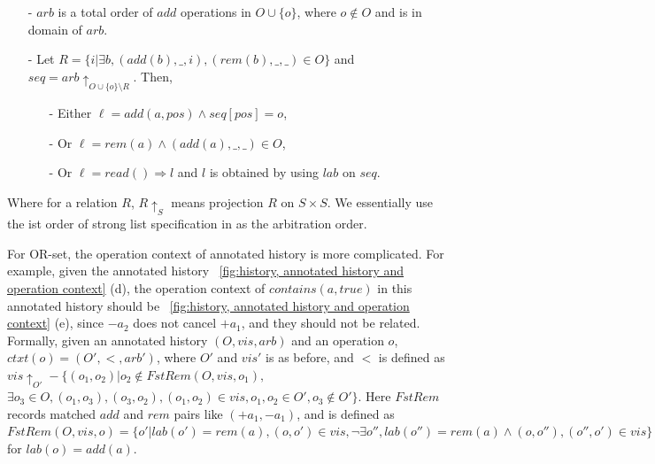 \begin{itemize}
\setlength{\itemsep}{0.5pt}
\item[-] %
$arb$ is a total order of $add$ operations in $O \cup \{ o \}$, where $o \notin O$ and is in domain of $arb$.

\item[-] Let $R = \{ i \vert \exists b, (add(b),\_,i),(rem(b),\_,\_) \in O \}$ and $\mathit{seq} = \mathit{arb} \uparrow_{ O \cup \{ o \} \setminus R }$. Then,

    \begin{itemize}
    \setlength{\itemsep}{0.5pt}
    \item[-] Either $\ell = add(a,pos) \wedge \mathit{seq}[pos] = o$,

    \item[-] Or $\ell = rem(a) \wedge (add(a),\_,\_) \in O$,

    \item[-] Or $\ell = read() \Rightarrow l$ and $l$ is obtained by using $\mathit{lab}$ on $\mathit{seq}$.
    \end{itemize}
\end{itemize}


Where for a relation $R$, $R \uparrow_{S}$ means projection $R$ on $S \times S$. We essentially use the ist order of strong list specification in \cite{Attiya:2016} as the arbitration order.


\begin{remark}
\label{remark: operation context of OR-set}
For OR-set, the operation context of annotated history is more complicated. {\color {red} For example, given the annotated history \figurename~\ref{fig:history, annotated history and operation context} (d), the operation context of $\mathit{contains}(a,\textit{true})$ in this annotated history should be \figurename~\ref{fig:history, annotated history and operation context} (e), since $-a_2$ does not cancel $+a_1$, and they should not be related.} Formally, given an annotated history $(O,\mathit{vis},\mathit{arb})$ and an operation $o$, $ctxt(o)=(O',<,\mathit{arb}')$, where $O'$ and $\mathit{vis}'$ is as before, and $<$ is defined as $\mathit{vis} \uparrow_{O'} - \{ (o_1,o_2) \vert o_2 \notin \mathit{FstRem}(O,\mathit{vis},o_1),$ $\exists o_3 \in O, (o_1,o_3), (o_3,o_2),(o_1,o_2) \in \mathit{vis}, o_1,o_2 \in O', o_3 \notin O' \}$. {\color {red}Here $\mathit{FstRem}$ records matched $\mathit{add}$ and $\mathit{rem}$ pairs like $(+a_1,-a_1)$,} and is defined as $\mathit{FstRem}(O,\mathit{vis},o) = \{o' \vert \mathit{lab}(o')=\mathit{rem}(a), (o,o') \in \mathit{vis}, \neg \exists o'',  lab(o'') = \mathit{rem}(a)  \wedge (o,o''),(o'',o') \in \mathit{vis} \}$ for $lab(o) = \mathit{add}(a)$.
\end{remark}





